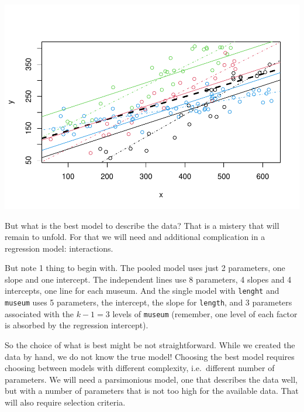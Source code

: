 \documentclass[
]{book}
\newenvironment{Shaded}{\begin{snugshade}}{\end{snugshade}}
\newcommand{\DataTypeTok}[1]{\textcolor[rgb]{0.13,0.29,0.53}{#1}}
\newcommand{\DecValTok}[1]{\textcolor[rgb]{0.00,0.00,0.81}{#1}}
\newcommand{\KeywordTok}[1]{\textcolor[rgb]{0.13,0.29,0.53}{\textbf{#1}}}
\newcommand{\NormalTok}[1]{#1}
\newcommand{\OperatorTok}[1]{\textcolor[rgb]{0.81,0.36,0.00}{\textbf{#1}}}
\begin{document}
\begin{Shaded}
\end{Shaded}

\includegraphics{ECOMODbook_files/figure-latex/a7.16-1.pdf}

But what is the best model to describe the data? That is a mistery that will remain to unfold. For that we will need and additional complication in a regression model: interactions.

But note 1 thing to begin with. The pooled model uses just 2 parameters, one slope and one intercept. The independent lines use 8 parameters, 4 slopes and 4 intercepts, one line for each museum. And the single model with \texttt{lenght} and \texttt{museum} uses 5 parameters, the intercept, the slope for \texttt{length}, and 3 parameters associated with the \(k-1=3\) levels of \texttt{museum} (remember, one level of each factor is absorbed by the regression intercept).

So the choice of what is best might be not straightforward. While we created the data by hand, we do not know the true model! Choosing the best model requires choosing between models with different complexity, i.e.~different number of parameters. We will need a parsimonious model, one that describes the data well, but with a number of parameters that is not too high for the available data. That will also require selection criteria.
\end{document}
